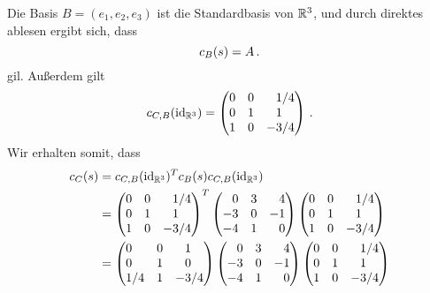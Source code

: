 Die Basis $B = (e_1, e_2, e_3)$ ist die Standardbasis von $\Real^3$, und durch direktes ablesen ergibt sich, dass
\[
  \repmatrixbilone{s}{B} = A \,.
\]
gil.
Außerdem gilt
\[
    \repmatrixhomo{\id_{\Real^3}}{C}{B}
  = \begin{pmatrix*}[r]
      0 & 0 &  1/4            \\
      0 & 1 &  1\phantom{/4}  \\
      1 & 0 & -3/4
    \end{pmatrix*} \,.
\]
Wir erhalten somit, dass
\begin{align*}
      \repmatrixbilone{s}{C}
  &=  \repmatrixhomo{\id_{\Real^3}}{C}{B}^T
      \repmatrixbilone{s}{B}
      \repmatrixhomo{\id_{\Real^3}}{C}{B}
  \\
  &=  \begin{pmatrix*}[r]
        0 & 0 &  1/4            \\
        0 & 1 &  1\phantom{/4}  \\
        1 & 0 & -3/4
      \end{pmatrix*}^T
      \begin{pmatrix*}[r]
         0  & 3 &  4  \\
        -3  & 0 & -1  \\
        -4  & 1 &  0
      \end{pmatrix*}
      \begin{pmatrix*}[r]
        0 & 0 &  1/4            \\
        0 & 1 &  1\phantom{/4}  \\
        1 & 0 & -3/4
      \end{pmatrix*}
  \\
  &=  \begin{pmatrix*}[l]
        0   & 0 &  \phantom{-}1   \\
        0   & 1 &  \phantom{-}0   \\
        1/4 & 1 &           -3/4
      \end{pmatrix*}
      \begin{pmatrix*}[r]
         0  & 3 &  4  \\
        -3  & 0 & -1  \\
        -4  & 1 &  0
      \end{pmatrix*}
      \begin{pmatrix*}[r]
        0 & 0 &  1/4            \\
        0 & 1 &  1\phantom{/4}  \\
        1 & 0 & -3/4
      \end{pmatrix*}
  \\

\end{align*}
